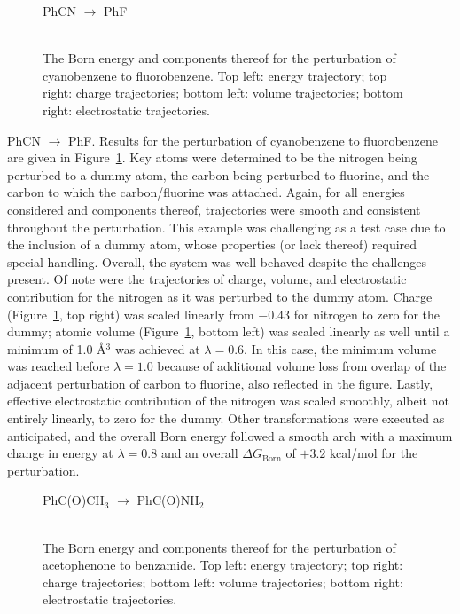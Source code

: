 \documentclass[12pt]{report}
\def\figlab{Figure}\def\figslab{\figlab s}
\newcommand*\fig[1]{\figlab~\ref{#1}}
\begin{document}
\begin{figure}[t!]
\centering
PhCN $\longrightarrow$ PhF\\
\hspace*{-1.3cm}\\
\hspace*{-1.3cm}
\caption{The Born energy and components thereof for the perturbation of cyanobenzene to fluorobenzene. Top left: energy trajectory; top right: charge trajectories; bottom left: volume trajectories; bottom right: electrostatic trajectories.}
\label{cnf}
\end{figure}

PhCN $\longrightarrow$ PhF. Results for the perturbation of cyanobenzene to fluorobenzene are given in \fig{cnf}. Key atoms were determined to be the nitrogen being perturbed to a dummy atom, the carbon being perturbed to fluorine, and the carbon to which the carbon/fluorine was attached. Again, for all energies considered and components thereof, trajectories were smooth and consistent throughout the perturbation. This example was challenging as a test case due to the inclusion of a dummy atom, whose properties (or lack thereof) required special handling. Overall, the system was well behaved despite the challenges present. Of note were the trajectories of charge, volume, and electrostatic contribution for the nitrogen as it was perturbed to the dummy atom. Charge (\fig{cnf}, top right) was scaled linearly from $-0.43$ for nitrogen to zero for the dummy; atomic volume (\fig{cnf}, bottom left) was scaled linearly as well until a minimum of 1.0 \AA$^{3}$ was achieved at $\lambda = 0.6$. In this case, the minimum volume was reached before $\lambda = 1.0$ because of additional volume loss from overlap of the adjacent perturbation of carbon to fluorine, also reflected in the figure. Lastly, effective electrostatic contribution of the nitrogen was scaled smoothly, albeit not entirely linearly, to zero for the dummy. Other transformations were executed as anticipated, and the overall Born energy followed a smooth arch with a maximum change in energy at $\lambda = 0.8$ and an overall $\Delta G_{ \textrm{Born}}$ of $+3.2$ kcal/mol for the perturbation.

\begin{figure}[t!]
\centering
PhC(O)CH$_3$  $\longrightarrow$ PhC(O)NH$_2$\\
\hspace*{-1.3cm}\\
\hspace*{-1.3cm}
\caption{The Born energy and components thereof for the perturbation of acetophenone to benzamide. Top left: energy trajectory; top right: charge trajectories; bottom left: volume trajectories; bottom right: electrostatic trajectories.}
\label{comenh2}
\end{figure}
\end{document}
